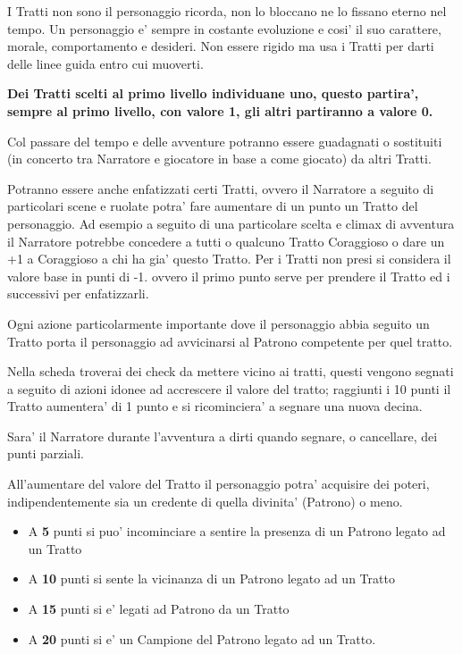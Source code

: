 \documentclass[a4paper,11pt,twoside,openany]{dndbook}
\begin{document}
I Tratti non sono il personaggio ricorda, non lo bloccano ne lo fissano eterno nel tempo. Un personaggio e' sempre in costante evoluzione e cosi' il suo carattere, morale, comportamento e desideri. Non essere rigido ma usa i Tratti per darti delle linee guida entro cui muoverti.

\textbf{Dei Tratti scelti al primo livello individuane uno, questo partira', sempre al primo livello, con valore 1, gli altri partiranno a valore 0.}

Col passare del tempo e delle avventure potranno essere guadagnati o sostituiti (in concerto tra Narratore e giocatore in base a come giocato) da altri Tratti.

Potranno essere anche enfatizzati certi Tratti, ovvero il Narratore a seguito di particolari scene e ruolate potra' fare aumentare di un punto un Tratto del personaggio. Ad esempio a seguito di una particolare scelta e climax di avventura il Narratore potrebbe concedere a tutti o qualcuno Tratto Coraggioso o dare un +1 a Coraggioso a chi ha gia' questo Tratto. Per i Tratti non presi si considera il valore base in punti di -1. ovvero il primo punto serve per prendere il Tratto ed i successivi per enfatizzarli.

Ogni azione particolarmente importante dove il personaggio abbia seguito un Tratto porta il personaggio ad avvicinarsi al Patrono competente per quel tratto.

Nella scheda troverai dei check da mettere vicino ai tratti, questi vengono segnati a seguito di azioni idonee ad accrescere il valore del tratto; raggiunti i 10 punti il Tratto aumentera' di 1 punto e si ricominciera' a segnare una nuova decina.

Sara' il Narratore durante l'avventura a dirti quando segnare, o cancellare, dei punti parziali.

All'aumentare del valore del Tratto il personaggio potra' acquisire dei poteri, indipendentemente sia un credente di quella divinita'
(Patrono) o meno.

\begin{itemize}
	\item A \textbf{5} punti si puo' incominciare a sentire la presenza di un Patrono
legato ad un Tratto
	\item A \textbf{10} punti si sente la vicinanza di un Patrono legato ad un Tratto
	\item A \textbf{15} punti si e' legati ad Patrono da un Tratto
	\item A \textbf{20} punti si e' un Campione del Patrono legato ad un Tratto.
\end{itemize}
\end{document}
